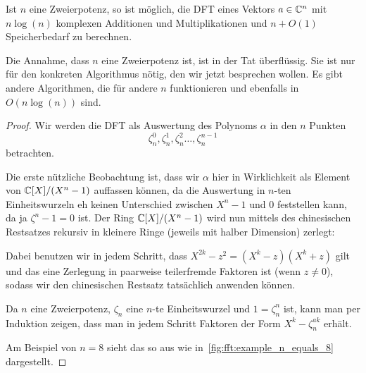 \begin{theorem}
    Ist $n$ eine Zweierpotenz, so ist möglich, die DFT eines Vektors $a\in\mathbb{C}^n$ mit $n\log(n)$ komplexen Additionen und Multiplikationen und $n+O(1)$ Speicherbedarf zu berechnen.
\end{theorem}
\begin{remark}
    Die Annahme, dass $n$ eine Zweierpotenz ist, ist in der Tat überflüssig. Sie ist nur für den konkreten Algorithmus nötig, den wir jetzt besprechen wollen. Es gibt andere Algorithmen, die für andere $n$ funktionieren und ebenfalls in $O(n\log(n))$ sind.
\end{remark}
\begin{proof}
    Wir werden die DFT als Auswertung des Polynoms $\alpha$ in den $n$ Punkten
    \[\zeta_n^0, \zeta_n^1,\zeta_n^2 \ldots, \zeta_n^{n-1}\]
    betrachten.

    \smallskip
    Die erste nützliche Beobachtung ist, dass wir $\alpha$ hier in Wirklichkeit als Element von $\mathbb{C}[X]/(X^n-1)$ auffassen können, da die Auswertung in $n$-ten Einheitswurzeln eh keinen Unterschied zwischen $X^n-1$ und $0$ feststellen kann, da ja $\zeta^n-1=0$ ist. Der Ring $\mathbb{C}[X]/(X^n-1)$ wird nun mittels des chinesischen Restsatzes rekursiv in kleinere Ringe (jeweils mit halber Dimension) zerlegt:

    Dabei benutzen wir in jedem Schritt, dass $X^{2k}-z^2 = (X^k-z)(X^k+z)$ gilt und das eine Zerlegung in paarweise teilerfremde Faktoren ist (wenn $z\neq 0$), sodass wir den chinesischen Restsatz tatsächlich anwenden können.

    Da $n$ eine Zweierpotenz, $\zeta_n$ eine $n$-te Einheitswurzel und $1=\zeta_n^n$ ist, kann man per Induktion zeigen, dass man in jedem Schritt Faktoren der Form $X^k-\zeta_n^{ak}$ erhält.

    \medskip
    Am Beispiel von $n=8$ sieht das so aus wie in~\ref{fig:fft:example_n_equals_8} dargestellt.


\end{proof}
